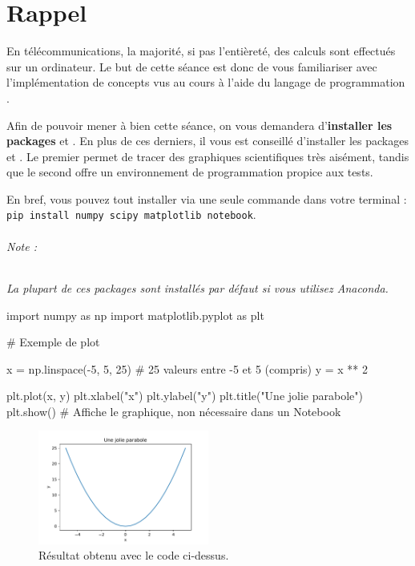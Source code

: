 \documentclass [a4paper, 11pt] {article}
\begin{document}
    \makeseancetitle
    \thispagestyle{firstpage}
    
    \part*{Rappel}
    
    En télécommunications, la majorité, si pas l'entièreté, des calculs sont effectués sur un ordinateur. Le but de cette séance est donc de vous familiariser avec l'implémentation de concepts vus au cours à l'aide du langage de programmation .
    
    Afin de pouvoir mener à bien cette séance, on vous demandera d'\textbf{installer les packages}  et . En plus de ces derniers, il vous est conseillé d'installer les packages  et . Le premier permet de tracer des graphiques scientifiques très aisément, tandis que le second offre un environnement de programmation propice aux tests.
    
    En bref, vous pouvez tout installer via une seule commande dans votre terminal : \texttt{pip install numpy scipy matplotlib notebook}.
    
    \paragraph{Note :} \textit{La plupart de ces packages sont installés par défaut si vous utilisez Anaconda.}
    
    \begin{python}
import numpy as np
import matplotlib.pyplot as plt

# Exemple de plot

x = np.linspace(-5, 5, 25)  # 25 valeurs entre -5 et 5 (compris)
y = x ** 2

plt.plot(x, y)
plt.xlabel("x")
plt.ylabel("y")
plt.title("Une jolie parabole")
plt.show()  # Affiche le graphique, non nécessaire dans un Notebook
    \end{python}
    
    \begin{figure}[H]
        \centering
        \includegraphics[width=0.5\textwidth]{imgs/parabole.pdf}
        \caption{Résultat obtenu avec le code ci-dessus.}
        \label{fig:parabole}
    \end{figure}
    
\end{document}
